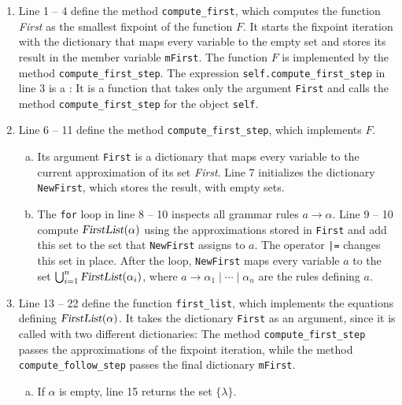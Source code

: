 \begin{enumerate}
\item Line 1 -- 4 define the method \texttt{compute\_first}, which computes the function \textsl{First} as the
      smallest fixpoint of the function $F$.  It starts the fixpoint iteration with the dictionary that maps every
      variable to the empty set and stores its result in the member variable \texttt{mFirst}.  The function $F$ is
      implemented by the method \texttt{compute\_first\_step}.  The expression \texttt{self.compute\_first\_step}
      in line 3 is a :  It is a function that takes only the argument
      \texttt{First} and calls the method \texttt{compute\_first\_step} for the object \texttt{self}.
\item Line 6 -- 11 define the method \texttt{compute\_first\_step}, which implements $F$.
      \begin{enumerate}[(a)]
      \item Its argument \texttt{First} is a dictionary that maps every variable to the current approximation of
            its set \textsl{First}.  Line 7 initializes the dictionary \texttt{NewFirst}, which stores the result,
            with empty sets.
      \item The \texttt{for} loop in line 8 -- 10 inspects all grammar rules $a \rightarrow \alpha$.  Line 9 -- 10
            compute $\textsl{FirstList}(\alpha)$ using the approximations stored in \texttt{First} and add this
            set to the set that \texttt{NewFirst} assigns to $a$.  The operator \texttt{|=} changes this set in
            place.  After the loop, \texttt{NewFirst} maps every variable $a$ to the set
            $\bigcup_{i=1}^n \textsl{FirstList}(\alpha_i)$, where $a \rightarrow \alpha_1 \mid \cdots \mid \alpha_n$
            are the rules defining $a$.
      \end{enumerate}
\item Line 13 -- 22 define the function \texttt{first\_list}, which implements the equations defining
      $\textsl{FirstList}(\alpha)$.  It takes the dictionary \texttt{First} as an argument, since it is called
      with two different dictionaries:  The method \texttt{compute\_first\_step} passes the approximations of
      the fixpoint iteration, while the method \texttt{compute\_follow\_step} passes the final dictionary
      \texttt{mFirst}.
      \begin{enumerate}[(a)]
      \item If $\alpha$ is empty, line 15 returns the set $\{\lambda\}$.

\end{enumerate}
\end{enumerate}
